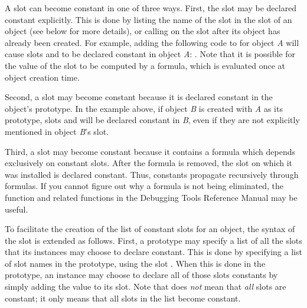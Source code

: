 A slot can become constant in one of three ways.  First, the slot may
be declared constant explicitly.  This is done by listing the name of
the slot in the  slot of an object (see below for more
details), or calling  on the slot after its object has
already been created.  For example, adding the following code to
 for object {\it A} will cause slots  and
 to be declared constant in object {\it A}: {\obeyspaces {}}.  Note that it is possible for the value of the 
slot to be computed by a formula, which is evaluated once at object
creation time.

Second, a slot may become constant because it is declared constant in
the object's prototype.  In the example above, if object {\it B} is created
with {\it A} as its prototype, slots  and  will be declared
constant in {\it B}, even if they are not explicitly mentioned in object {\it B}'s
 slot.

Third, a slot may become constant because it contains a formula which
depends exclusively on constant slots.  After the formula is removed,
the slot on which it was installed is declared constant.  Thus,
constants propagate recursively through formulas.
If you cannot figure out why a formula is not being eliminated, the function
 and related functions in the Debugging Tools
Reference Manual may be useful.

To facilitate the creation of the list of constant slots for an
object, the syntax of the  slot is extended as follows.
First, a prototype may specify a list of all the slots that its
instances may choose to declare constant.  This is done by specifying
a list of slot names in the prototype, using the slot
.  When this is done in the prototype, an instance
may choose to declare all of those slots constants by simply adding
the value \value{t} to its  slot.  Note that \value{t}
does {\it not} mean that {\it all} slots are constant; it only means that
all slots in the  list become constant.

